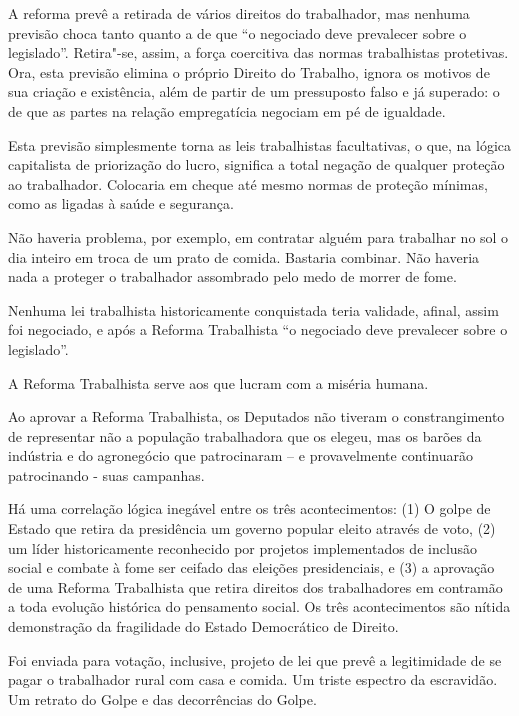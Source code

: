 A reforma prevê a retirada de vários direitos do trabalhador, mas
nenhuma previsão choca tanto quanto a de que ``o negociado deve
prevalecer sobre o legislado''. Retira"-se, assim, a força coercitiva das
normas trabalhistas protetivas. Ora, esta previsão elimina o próprio
Direito do Trabalho, ignora os motivos de sua criação e existência, além
de partir de um pressuposto falso e já superado: o de que as partes na
relação empregatícia negociam em pé de igualdade.

Esta previsão simplesmente torna as leis trabalhistas facultativas, o
que, na lógica capitalista de priorização do lucro, significa a total
negação de qualquer proteção ao trabalhador. Colocaria em cheque até
mesmo normas de proteção mínimas, como as ligadas à saúde e segurança.

Não haveria problema, por exemplo, em contratar alguém para trabalhar no
sol o dia inteiro em troca de um prato de comida. Bastaria combinar. Não
haveria nada a proteger o trabalhador assombrado pelo medo de morrer de
fome.

Nenhuma lei trabalhista historicamente conquistada teria validade,
afinal, assim foi negociado, e após a Reforma Trabalhista ``o negociado
deve prevalecer sobre o legislado''.

A Reforma Trabalhista serve aos que lucram com a miséria humana.

Ao aprovar a Reforma Trabalhista, os Deputados não tiveram o
constrangimento de representar não a população trabalhadora que os
elegeu, mas os barões da indústria e do agronegócio que patrocinaram --
e provavelmente continuarão patrocinando - suas campanhas.

Há uma correlação lógica inegável entre os três acontecimentos: (1) O
golpe de Estado que retira da presidência um governo popular eleito
através de voto, (2) um líder historicamente reconhecido por projetos
implementados de inclusão social e combate à fome ser ceifado das
eleições presidenciais, e (3) a aprovação de uma Reforma Trabalhista que
retira direitos dos trabalhadores em contramão a toda evolução histórica
do pensamento social. Os três acontecimentos são nítida demonstração da
fragilidade do Estado Democrático de Direito.

Foi enviada para votação, inclusive, projeto de lei que prevê a
legitimidade de se pagar o trabalhador rural com casa e comida. Um
triste espectro da escravidão. Um retrato do Golpe e das decorrências do
Golpe.